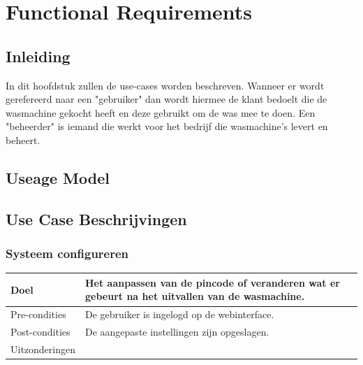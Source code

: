 \chapter{Functional Requirements}
\section{Inleiding}
In dit hoofdstuk zullen de use-cases worden beschreven.
Wanneer er wordt gerefereerd naar een "gebruiker" dan wordt hiermee de klant bedoelt die de wasmachine gekocht heeft en deze gebruikt om de was mee te doen.
Een "beheerder" is iemand die werkt voor het bedrijf die wasmachine's levert en beheert.
\newpage
\section{Useage Model}
\newpage
  


\section{Use Case Beschrijvingen}

\subsection{Systeem configureren}
\begin{center}
  \begin{tabular}{ | p{4cm} | p{8.5cm} | }    \hline
    Doel & Het aanpassen van de pincode of veranderen wat er gebeurt na het uitvallen van de wasmachine. \\ \hline
    Pre-condities & De gebruiker is ingelogd op de webinterface. \\ \hline
    Post-condities & De aangepaste instellingen zijn opgeslagen. \\ \hline
    Uitzonderingen & \\
    \hline
  \end{tabular}
\end{center}

